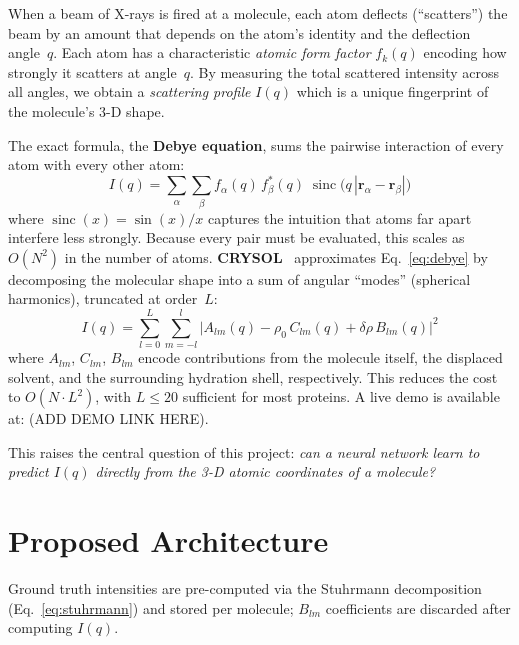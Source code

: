 \documentclass[final]{article}
\DeclareMathOperator{\sinc}{sinc}
\begin{document}
When a beam of X-rays is fired at a molecule, each atom deflects (``scatters'') the beam by an
amount that depends on the atom's identity and the deflection angle~$q$. Each atom has a
characteristic \emph{atomic form factor} $f_k(q)$ encoding how strongly it scatters at
angle~$q$. By measuring the total scattered intensity across all angles, we obtain a
\emph{scattering profile} $I(q)$ which is a unique fingerprint of the molecule's 3-D shape.

The exact formula, the \textbf{Debye equation}, sums the pairwise interaction of every atom with
every other atom:
\begin{equation}
    I(q) = \sum_{\alpha}\sum_{\beta}
    f_{\alpha}(q)\,f^{*}_{\beta}(q)\;\sinc\!\bigl(q\,|\mathbf{r}_{\alpha} - \mathbf{r}_{\beta}|\bigr)
    \label{eq:debye}
\end{equation}
where $\sinc(x)=\sin(x)/x$ captures the intuition that atoms far apart interfere less strongly.
Because every pair must be evaluated, this scales as $O(N^2)$ in the number of atoms.
\textbf{CRYSOL}~\cite{svergun_crysol_1995} approximates Eq.~\eqref{eq:debye} by decomposing the
molecular shape into a sum of angular ``modes'' (spherical harmonics), truncated at order~$L$:
\begin{equation}
    I(q) = \sum_{l=0}^{L}\sum_{m=-l}^{l}
    \bigl|A_{lm}(q) - \rho_0\,C_{lm}(q) + \delta\rho\,B_{lm}(q)\bigr|^2
    \label{eq:crysol}
\end{equation}
where $A_{lm}$, $C_{lm}$, $B_{lm}$ encode contributions from the molecule itself, the
displaced solvent, and the surrounding hydration shell, respectively. This reduces the cost to
$O(N \cdot L^2)$, with $L \leq 20$ sufficient for most proteins. A live demo is available at:
(ADD DEMO LINK HERE).

This raises the central question of this project: \emph{can a neural network learn to predict
$I(q)$ directly from the 3-D atomic coordinates of a molecule?}

\section{Proposed Architecture}

Ground truth intensities are pre-computed via the Stuhrmann decomposition (Eq.~\ref{eq:stuhrmann})
and stored per molecule; $B_{lm}$ coefficients are discarded after computing $I(q)$.
\end{document}

